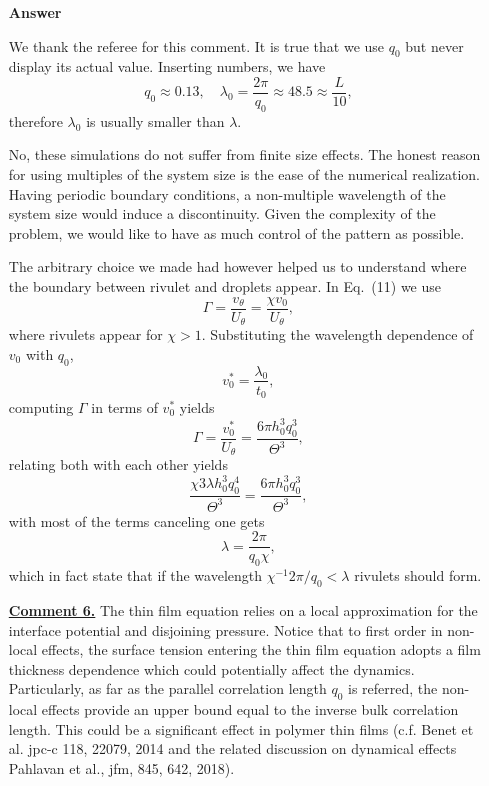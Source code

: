 \documentclass[12pt,english]{article}
\begin{document}
\begin{itemize}
\item[ \textbf{{Answer}}]
{
We thank the referee for this comment.
It is true that we use $q_0$ but never display its actual value.
Inserting numbers, we have 
\begin{equation*}
    q_0 \approx 0.13, \quad \lambda_0 = \frac{2\pi}{q_0} \approx 48.5 \approx \frac{L}{10},  
\end{equation*}
therefore $\lambda_0$ is usually smaller than $\lambda$.

No, these simulations do not suffer from finite size effects.
The honest reason for using multiples of the system size is the ease of the numerical realization.
Having periodic boundary conditions, a non-multiple wavelength of the system size would induce a discontinuity.
Given the complexity of the problem, we would like to have as much control of the pattern as possible.

The arbitrary choice we made had however helped us to understand where the boundary between rivulet and droplets appear.
In Eq.~(11) we use
\begin{equation*}
    \Gamma = \frac{v_{\theta}}{U_{\theta}} = \frac{\chi v_0}{U_{\theta}},
\end{equation*}
where rivulets appear for $\chi > 1$.
Substituting the wavelength dependence of $v_0$ with $q_0$,
\begin{equation*}
    v_0^{\ast} = \frac{\lambda_0}{t_0}, 
\end{equation*}
computing $\Gamma$ in terms of $v_0^{\ast}$ yields
\begin{equation*}
    \Gamma = \frac{v_0^{\ast}}{U_{\theta}} = \frac{6\pi h_0^3 q_0^3}{\Theta^3},
\end{equation*}
relating both with each other yields
\begin{equation*}
    \frac{\chi 3\lambda h_0^3 q_0^4}{\Theta^3} = \frac{6\pi h_0^3 q_0^3}{\Theta^3},
\end{equation*}
with most of the terms canceling one gets
\begin{equation*}
    \lambda = \frac{2\pi}{q_0\chi}, 
\end{equation*}
which in fact state that if the wavelength $\chi^{-1}2\pi/q_0 < \lambda$ rivulets should form. 
}

\item[ \textbf{\underline{Comment 6.}}]
{
The thin film equation relies on a local approximation for the interface potential and disjoining pressure. 
Notice that to first order in non-local effects, the surface tension entering the thin film equation adopts a film thickness dependence which could potentially affect the dynamics. 
Particularly, as far as the parallel correlation length $q_0$ is referred, the non-local effects provide an upper bound equal to the inverse bulk correlation length. 
This could be a significant effect in polymer thin films (c.f. Benet et al. jpc-c 118, 22079, 2014 and the related discussion on dynamical effects Pahlavan et al., jfm, 845, 642, 2018).
}


\end{itemize}
\end{document}
